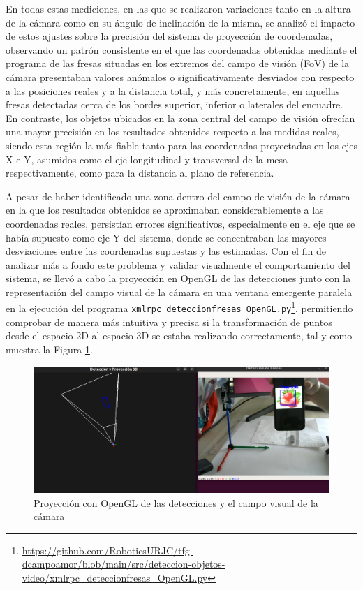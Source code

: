 En todas estas mediciones, en las que se realizaron variaciones tanto en la altura de la cámara como en su ángulo de inclinación de la misma, se analizó el impacto de estos ajustes sobre la precisión del sistema de proyección de coordenadas, observando un patrón consistente en el que las coordenadas obtenidas mediante el programa de las fresas situadas en los extremos del campo de visión (FoV) de la cámara presentaban valores anómalos o significativamente desviados con respecto a las posiciones reales y a la distancia total, y más concretamente, en aquellas fresas detectadas cerca de los bordes superior, inferior o laterales del encuadre. En contraste, los objetos ubicados en la zona central del campo de visión ofrecían una mayor precisión en los resultados obtenidos respecto a las medidas reales, siendo esta región la más fiable tanto para las coordenadas proyectadas en los ejes X e Y, asumidos como el eje longitudinal y transversal de la mesa respectivamente, como para la distancia al plano de referencia.

A pesar de haber identificado una zona dentro del campo de visión de la cámara en la que los resultados obtenidos se aproximaban considerablemente a las coordenadas reales, persistían errores significativos, especialmente en el eje que se había supuesto como eje Y del sistema, donde se concentraban las mayores desviaciones entre las coordenadas supuestas y las estimadas. Con el fin de analizar más a fondo este problema y validar visualmente el comportamiento del sistema, se llevó a cabo la proyección en OpenGL de las detecciones junto con la representación del campo visual de la cámara en una ventana emergente paralela en la ejecución del programa \verb|xmlrpc_deteccionfresas_OpenGL.py|\footnote{\url{https://github.com/RoboticsURJC/tfg-dcampoamor/blob/main/src/deteccion-objetos-video/xmlrpc_deteccionfresas_OpenGL.py}}, permitiendo comprobar de manera más intuitiva y precisa si la transformación de puntos desde el espacio 2D al espacio 3D se estaba realizando correctamente, tal y como muestra la Figura \ref{fig:proy_OpenGL_deteccion}.

   \begin{figure}[H]
    \centering
    \begin{center}
      \includegraphics[width=155mm]{figs/Proyeccion plano mesa OpenGL con ejes coordenadas_2.png}
    \end{center}
    \caption{Proyección con OpenGL de las detecciones y el campo visual de la cámara}
    \label{fig:proy_OpenGL_deteccion}
  \end{figure}


